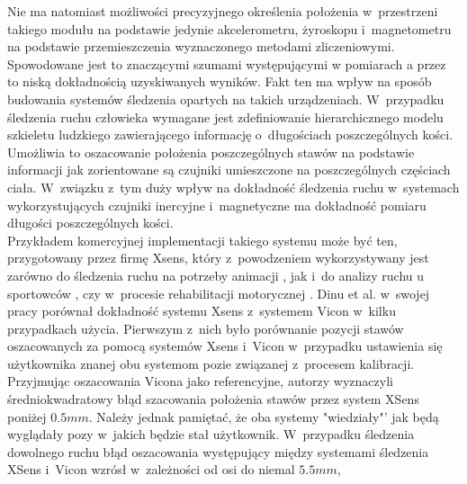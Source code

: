 Nie ma natomiast możliwości precyzyjnego określenia położenia w~przestrzeni takiego modułu na podstawie jedynie akcelerometru, żyroskopu i~magnetometru na podstawie przemieszczenia wyznaczonego metodami zliczeniowymi. Spowodowane jest to znaczącymi szumami występującymi w pomiarach a przez to niską dokładnością uzyskiwanych wyników. Fakt ten ma wpływ na sposób budowania systemów śledzenia opartych na takich urządzeniach. W~przypadku śledzenia ruchu człowieka wymagane jest zdefiniowanie hierarchicznego modelu szkieletu ludzkiego zawierającego informację o~długościach poszczególnych kości. Umożliwia to oszacowanie położenia poszczególnych stawów na podstawie informacji jak zorientowane są czujniki umieszczone na poszczególnych częściach ciała. W~związku z~tym duży wpływ na dokładność śledzenia ruchu w~systemach wykorzystujących czujniki inercyjne i~magnetyczne ma dokładność pomiaru długości poszczególnych kości.\\
Przykładem komercyjnej implementacji takiego systemu może być ten, przygotowany przez firmę Xsens, który z~powodzeniem wykorzystywany jest zarówno do śledzenia ruchu na potrzeby animacji \cite{XsensEnt}, jak i~do analizy ruchu u sportowców \cite{XsensSport1,XsensSport2}, czy w~procesie rehabilitacji motorycznej \cite{XsensRehab}. Dinu et al. w~swojej pracy \cite{Dinu2016} porównał dokładność systemu Xsens z~systemem Vicon w~kilku przypadkach użycia. Pierwszym z~nich było porównanie pozycji stawów oszacowanych za pomocą systemów Xsens i~Vicon w~przypadku ustawienia się użytkownika znanej obu systemom pozie związanej z~procesem kalibracji. Przyjmując oszacowania Vicona jako referencyjne, autorzy wyznaczyli średniokwadratowy błąd szacowania położenia stawów przez system XSens poniżej $0.5mm$. Należy jednak pamiętać, że oba systemy "wiedziały"' jak będą wyglądały pozy w~jakich będzie stał użytkownik. W~przypadku śledzenia dowolnego ruchu błąd oszacowania występujący między systemami śledzenia XSens i~Vicon wzrósł w~zależności od osi do niemal $5.5mm$,


